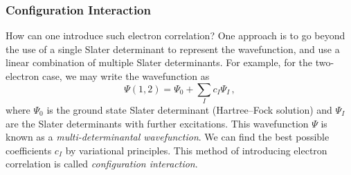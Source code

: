\documentclass{article}
\theoremstyle{plain}\theoremheaderfont{\normalfont\itshape}\theorembodyfont{\rmfamily}\theoremseparator{.}\newtheorem*{rem}{Remark}\newtheorem*{ex}{Example}\newtheorem*{proof}{Proof}\newtheorem*{altp}{Alternative proof}
\theoremstyle{plain}\theoremheaderfont{\normalfont\bfseries}\theorembodyfont{\rmfamily}\theoremseparator{.}\newtheorem{thm}{Theorem}[section]\newtheorem{lem}[thm]{Lemma}\newtheorem{prop}[thm]{Proposition}\newtheorem*{cor}{Corollary}\newtheorem{defn}[thm]{Definition}\newtheorem{clm}[thm]{Claim}\newtheorem{clminproof}{Claim}\newtheorem{pos}{Postulate}[section]
\theoremstyle{break}\theoremheaderfont{\normalfont\itshape}\theorembodyfont{\rmfamily}\theoremseparator{.\medskip}\newtheorem*{proofskip}{Proof}\newtheorem*{exs}{Examples}\newtheorem*{rems}{Remarks}
\theoremstyle{break}\theoremheaderfont{\normalfont\bfseries}\theorembodyfont{\rmfamily}\theoremseparator{.\medskip}\newtheorem{lemskip}[thm]{Lemma}\newtheorem{defnskip}[thm]{Definition}\newtheorem{propskip}[thm]{Proposition}\newtheorem{thmskip}[thm]{Theorem}
\numberwithin{equation}{section}
\begin{document}
    \subsubsection{Configuration Interaction}
    How can one introduce such electron correlation? One approach is to go beyond the use of a single Slater determinant to represent the wavefunction, and use a linear combination of multiple Slater determinants. For example, for the two-electron case, we may write the wavefunction as
    \begin{equation}
        \Psi(1,2)=\Psi_0+\sum_I c_I\Psi_I\,,
    \end{equation}
    where \(\Psi_0\) is the ground state Slater determinant (Hartree--Fock solution) and \(\Psi_I\) are the Slater determinants with further excitations. This wavefunction \(\Psi\) is known as a \textit{multi-determinantal wavefunction}. We can find the best possible coefficients \(c_I\) by variational principles. This method of introducing electron correlation is called \textit{configuration interaction}.

    \begin{figure}[ht!]
        \centering
    \end{figure}
\end{document}
